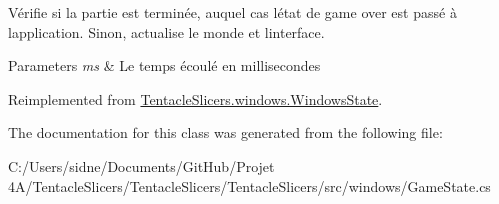 Vérifie si la partie est terminée, auquel cas l\textquotesingle{}état de game over est passé à l\textquotesingle{}application. Sinon, actualise le monde et l\textquotesingle{}interface. 


\begin{DoxyParams}{Parameters}
{\em ms} & Le temps écoulé en millisecondes \\
\hline
\end{DoxyParams}


Reimplemented from \hyperlink{class_tentacle_slicers_1_1windows_1_1_windows_state_a21040da05a02cf0bf9d8dfbdcbe5274d}{Tentacle\+Slicers.\+windows.\+Windows\+State}.



The documentation for this class was generated from the following file\+:\begin{DoxyCompactItemize}
\item 
C\+:/\+Users/sidne/\+Documents/\+Git\+Hub/\+Projet 4\+A/\+Tentacle\+Slicers/\+Tentacle\+Slicers/\+Tentacle\+Slicers/src/windows/Game\+State.\+cs\end{DoxyCompactItemize}
